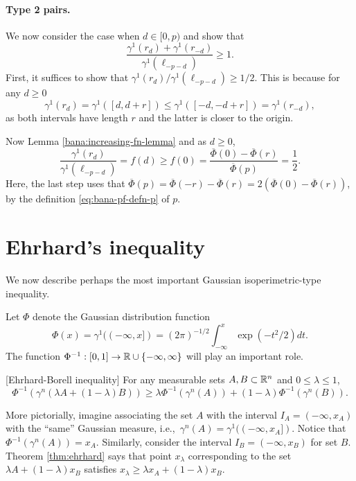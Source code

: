 \paragraph{Type 2 pairs.}
We now  consider the case when $d\in [0,p)$ and show that \[\frac{\gamma^1(r_{d})+\gamma^1(r_{-d})}{\gamma^1(\ell_{-p-d})}\geq 1.\] 
First, it suffices to show that $\gamma^1(r_d)/\gamma^1(\ell_{-p-d}) \geq 1/2$. This is because 
for any $d\geq 0$  
\[ \gamma^1(r_{d}) = \gamma^1([d,d+r]) \leq \gamma^1([-d,-d+r]) = \gamma^1(r_{-d}),\] as both intervals have length $r$ and the latter is closer to the origin.

Now Lemma \ref{bana:increasing-fn-lemma} and as $d\geq 0$,
\[  \frac{\gamma^1(r_d)}{\gamma^1(\ell_{-p-d})} = f(d) \geq f(0)=  \frac{\overline{\Phi}(0)-\overline{\Phi}(r)}{ \overline{\Phi}(p)} = \frac{1}{2}.\]
 Here, the last step uses that $\overline{\Phi}(p) = \overline{\Phi}(-r) - \overline{\Phi}(r) = 2 (\overline{\Phi}(0)-\overline{\Phi}(r))$,  
by the definition \eqref{eq:bana-pf-defn-p} of $p$.



\section{Ehrhard's inequality}
\label{sec:bana-proof-ehrhard}
We now describe perhaps the most important Gaussian isoperimetric-type inequality.

Let $\Phi$ denote the Gaussian distribution function
\[  \Phi(x) = \gamma^1((-\infty,x]) = (2\pi)^{-1/2}\int_{-\infty}^x \exp(-t^2/2) dt.\]
The function $\Phi^{-1}:[0,1] \rightarrow  \mathbb{R} \cup \{-\infty,\infty\}$ will play an important role.

\begin{theorem}
\label{thm:ehrhard} [Ehrhard-Borell inequality] \cite{Ehrhard1983, BORELL2003}
 For any measurable sets $A, B \subset \mathbb{R}^n$ and $0 \leq \lambda  \leq 1$, 
\begin{equation}
\label{ineq:ehrhard}
\Phi^{-1}(\gamma^n(\lambda A + (1-\lambda)B)) \geq \lambda \Phi^{-1} (\gamma^n(A)) + (1-\lambda) \Phi^{-1} (\gamma^n(B)).
\end{equation}
\end{theorem}

More pictorially, imagine associating the set $A$ with the interval $I_A=(-\infty,x_A)$ with the ``same'' Gaussian measure, i.e.,~$\gamma^n(A) = \gamma^1((-\infty,x_A])$. 
Notice that $\Phi^{-1} (\gamma^n(A)) =x_A$. 
Similarly, consider the interval $I_B=(-\infty,x_B)$ for set $B$. Theorem \ref{thm:ehrhard} says that point $x_\lambda$ corresponding to the set $\lambda A + (1-\lambda) x_B$ satisfies $x_\lambda \geq \lambda x_A + (1-\lambda) x_B$. 


